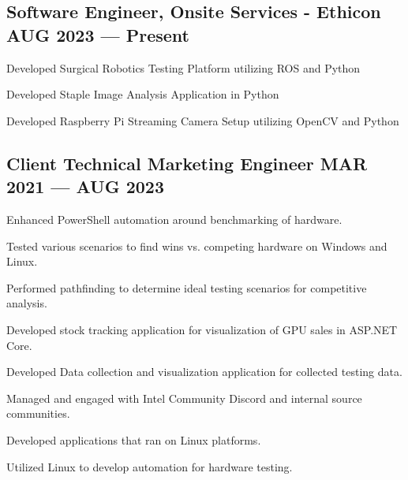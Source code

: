 \subsection{{Software Engineer, Onsite Services - Ethicon \hfill AUG 2023 --- Present}}
\begin{zitemize}
\item Developed Surgical Robotics Testing Platform utilizing ROS and Python
\item Developed Staple Image Analysis Application in Python
\item Developed Raspberry Pi Streaming Camera Setup utilizing OpenCV and Python
\end{zitemize}

\subsection{{Client Technical Marketing Engineer \hfill MAR 2021 --- AUG 2023}}
\begin{zitemize}
\item Enhanced PowerShell automation around benchmarking of hardware.
\item Tested various scenarios to find wins vs. competing hardware on Windows and Linux.
\item Performed pathfinding to determine ideal testing scenarios for competitive analysis.
\item Developed stock tracking application for visualization of GPU sales in ASP.NET Core.
\item Developed Data collection and visualization application for collected testing data.
\item Managed and engaged with Intel Community Discord and internal source communities.
\item Developed applications that ran on Linux platforms.
\item Utilized Linux to develop automation for hardware testing.
\end{zitemize}

